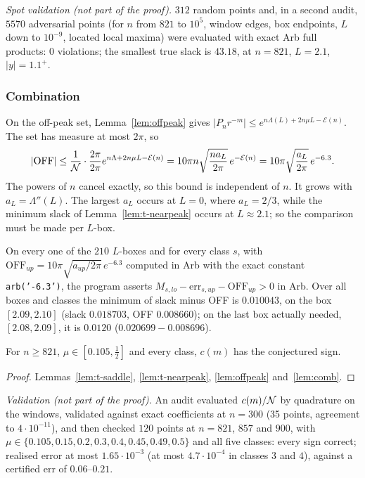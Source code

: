 \emph{Spot validation (not part of the proof).} $312$ random points and, in a second audit, $5570$ adversarial points (for
$n$ from $821$ to $10^5$, window edges, box endpoints, $L$ down to $10^{-9}$, located local maxima) were evaluated with
exact Arb full products: $0$ violations; the smallest true slack is $43.18$, at $n=821$, $L=2.1$, $|y|=1.1^+$.

\subsubsection{Combination}\label{sec:comb}
On the off-peak set, Lemma~\ref{lem:offpeak} gives $|P_nr^{-m}|\le e^{n\Lambda(L)+2n\mu L-\mathcal E(n)}$. The set has
measure at most $2\pi$, so
\[
|\mathrm{OFF}|\le\frac{1}{\mathcal N}\cdot\frac{2\pi}{2\pi}e^{n\Lambda+2n\mu L-\mathcal E(n)}=10\pi n\sqrt{\frac{na_L}{2\pi}}\,e^{-\mathcal E(n)}
=10\pi\sqrt{\frac{a_L}{2\pi}}\,e^{-6.3}.
\]
The powers of $n$ cancel exactly, so this bound is independent of $n$. It grows with $a_L=\Lambda''(L)$. The largest
$a_L$ occurs at $L=0$, where $a_L=2/3$, while the minimum slack of Lemma~\ref{lem:t-nearpeak} occurs at $L\approx2.1$; so
the comparison must be made per $L$-box.

\begin{lemma}[combination]\label{lem:comb}
On every one of the $210$ $L$-boxes and for every class $s$, with
$\mathrm{OFF}_{up}=10\pi\sqrt{a_{up}/2\pi}\,e^{-6.3}$ computed in Arb with the exact constant \texttt{arb('-6.3')}, the
program asserts $M_{s,lo}-\mathrm{err}_{s,up}-\mathrm{OFF}_{up}>0$ in Arb. Over all boxes and classes the minimum of
slack minus OFF is $0.010043$, on the box $[2.09,2.10]$ (slack $0.018703$, OFF $0.008660$); on the last box actually
needed, $[2.08,2.09]$, it is $0.0120$ ($0.020699-0.008696$).
\end{lemma}

\begin{corollary}\label{cor:centre}
For $n\ge821$, $\mu\in[0.105,\tfrac12]$ and every class, $c(m)$ has the conjectured sign.
\end{corollary}
\begin{proof}
Lemmas~\ref{lem:t-saddle}, \ref{lem:t-nearpeak}, \ref{lem:offpeak} and~\ref{lem:comb}.
\end{proof}

\emph{Validation (not part of the proof).} An audit evaluated $c(m)/\mathcal N$ by quadrature on the windows, validated against
exact coefficients at $n=300$ (35 points, agreement to $4\cdot10^{-11}$), and then checked $120$ points at $n=821$, $857$
and $900$, with $\mu\in\{0.105,0.15,0.2,0.3,0.4,0.45,0.49,0.5\}$ and all five classes: every sign correct; realised error at
most $1.65\cdot10^{-3}$ (at most $4.7\cdot10^{-4}$ in classes $3$ and $4$), against a certified $\mathrm{err}$ of
$0.06$--$0.21$.

